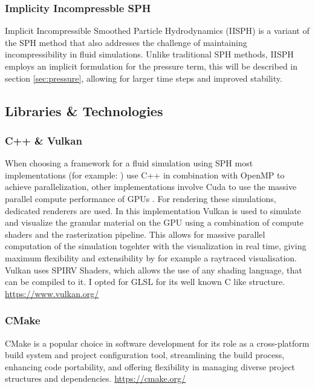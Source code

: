 \documentclass[intern]{cgMA}
\begin{document}
    \subsubsection*{Implicity Incompressble SPH}
    Implicit Incompressible Smoothed Particle Hydrodynamics (IISPH) is a variant of the SPH method that also addresses the challenge of maintaining incompressibility in fluid simulations. Unlike traditional SPH methods, IISPH employs an implicit formulation for the pressure term, this will be described in section \ref{sec:pressure}, allowing for larger time steps and improved stability.\cite{6570475} %

        
    \subsection{Libraries \& Technologies}

    \subsubsection*{C++ \& Vulkan}
    When choosing a framework for a fluid simulation using SPH most implementations (for example: \cite{splishsplash} \cite{dualsphysics}) use C++ in combination with OpenMP to achieve parallelization, other implementations involve Cuda to use the massive parallel compute performance of GPUs \cite{dualsphysics}. For rendering these simulations, dedicated renderers are used. In this implementation Vulkan is used to simulate and visualize the granular material on the GPU using a combination of compute shaders and the rasterization pipeline. This allows for massive parallel computation of the simulation togehter with the visualization in real time, giving maximum flexibility and extensibility by for example a raytraced visualisation. Vulkan uses SPIRV Shaders, which allows the use of any shading language, that can be compiled to it. I opted for GLSL for its well known C like structure. \url{https://www.vulkan.org/}

    \subsubsection*{CMake}    
    CMake is a popular choice in software development for its role as a cross-platform build system and project configuration tool, streamlining the build process, enhancing code portability, and offering flexibility in managing diverse project structures and dependencies. \url{https://cmake.org/}
\end{document}
